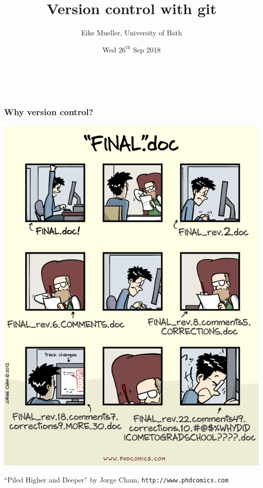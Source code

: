 \documentclass{beamer}
\begin{document}
\title{Version control with git}
\author{Eike Mueller, University of Bath}
\date{Wed $26^{\text{th}}$ Sep 2018} 


\begin{frame}
  \frametitle{$ $}
  \titlepage
\end{frame}


\begin{frame}
  \frametitle{Why version control?}
  \begin{center}
    \includegraphics[width=0.5\linewidth]{phdcomics.png}
  \end{center}
  {\footnotesize ``Piled Higher and Deeper'' by Jorge Cham, \texttt{http://www.phdcomics.com}}
\end{frame}

\end{document}
